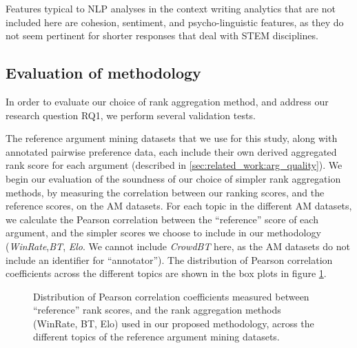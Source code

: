 \documentclass[notitlepage,12pt]{jedm}
\begin{document}
Features typical to NLP analyses in the context writing analytics that are not 
included here are cohesion, sentiment, and psycho-linguistic features, as they 
do not seem pertinent for shorter responses that deal with STEM disciplines.

 
\subsection{Evaluation of methodology}\label{sec:methodology_eval}

In order to evaluate our choice of rank aggregation method, and address our 
research question RQ1, we perform several validation tests.

The reference argument mining datasets that we use for this study, along 
with annotated pairwise preference data, each include their own derived 
aggregated rank score for each argument (described in 
\ref{sec:related_work:arg_quality}).
We begin our evaluation of the soundness of our choice of simpler rank 
aggregation methods, by measuring the correlation between our ranking scores, 
and the reference scores, on the AM datasets.
For each topic in the different AM datasets, we calculate the Pearson 
correlation between the ``reference'' score of each argument, and the simpler 
scores we choose to include in our methodology (\textit{WinRate},\textit{BT}, 
\textit{Elo}. We cannot include \textit{CrowdBT} here, as the AM datasets do 
not include an identifier for ``annotator'').
The distribution of Pearson correlation coefficients across the different 
topics are shown in the box plots in figure \ref{fig:corr_to_reference_score}.

\begin{figure}[H]
	\centering
	\scalebox{0.5}{}
	\caption{Distribution of Pearson correlation coefficients measured between 
		``reference'' rank scores, and the rank aggregation methods (WinRate, 
		BT, 
		Elo) used in our proposed methodology, across the different topics of 
		the 
		reference argument mining datasets.}
	\label{fig:corr_to_reference_score}
\end{figure}
\end{document}
